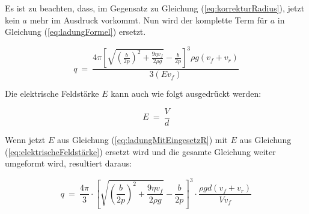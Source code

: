 \noindent Es ist zu beachten, dass, im Gegensatz zu Gleichung (\ref{eq:korrekturRadius}), jetzt kein $a$ mehr im Ausdruck vorkommt. Nun wird der komplette Term für $a$ in Gleichung (\ref{eq:ladungFormel}) ersetzt.

\begin{equation}\label{eq:ladungMitEingesetzR}
	q \ = \ \frac{4\pi \left[ \sqrt{\left( \frac{b}{2p}\right)^2 + \frac{9\eta v_f}{2\rho g}} - \frac{b}{2p} \right]^3 \rho g(v_f + v_r) }{3(Ev_f)}
\end{equation}

\noindent Die elektrische Feldstärke $E$ kann auch wie folgt ausgedrückt werden:

\begin{equation}\label{eq:elektrischeFeldstärke}
	E \ = \ \frac{V}{d}
\end{equation}

\noindent Wenn jetzt $E$ aus Gleichung (\ref{eq:ladungMitEingesetzR}) mit $E$ aus Gleichung (\ref{eq:elektrischeFeldstärke}) ersetzt wird und die gesamte Gleichung weiter umgeformt wird, resultiert daraus:

\begin{equation}\label{eq:letzteFormel}
	q \ = \ \frac{4\pi}{3} \cdot \left[ \sqrt{\left( \frac{b}{2p}\right)^2 + \frac{9\eta v_f}{2\rho g}} - \frac{b}{2p} \right]^3 \cdot \frac{\rho gd(v_f + v_r)}{Vv_f}
\end{equation}




	


